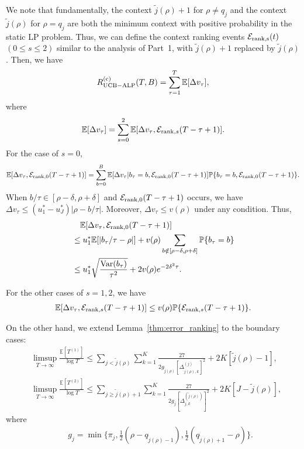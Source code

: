 We note that fundamentally, the context $\tilde{j}(\rho) + 1$ for $\rho \neq q_j$ and the context $\tilde{j}(\rho)$ for $\rho = q_j$ are both the minimum context with positive probability in the static LP problem.
Thus, we can define the  context ranking events $\mathcal{E}_{\rm rank,s}(t)$ $(0 \leq s\leq 2)$ similar to  the analysis of Part~1, with $\tilde{j}(\rho) + 1$ replaced by $\tilde{j}(\rho)$.
Then, we have
\begin{eqnarray}
R_{\rm {UCB-ALP}}^{({\rm c})}(T, B) = \sum_{\tau = 1}^T \mathbb{E}[\Delta {v}_{\tau}], \nonumber
\end{eqnarray}
where
\begin{eqnarray}
\mathbb{E}[\Delta v_\tau]  =  \sum_{s = 0}^2\mathbb{E}[\Delta {v}_{\tau},  \mathcal{E}_{{\rm rank}, s}(T - \tau + 1)]. \nonumber
\end{eqnarray}
For the case of $s = 0$,
\begin{align}
\mathbb{E}[\Delta {v}_{\tau},  \mathcal{E}_{{\rm rank}, 0}(T - \tau + 1)] = \sum_{b = 0}^B \mathbb{E}[\Delta {v}_{\tau}|b_{\tau} = b, \mathcal{E}_{{\rm rank}, 0}(T - \tau + 1)]\mathbb{P}\{b_\tau = b, \mathcal{E}_{{\rm rank}, 0}(T - \tau + 1)\}. \nonumber
\end{align}
When $b/\tau \in [\rho -\delta, \rho + \delta]$ and $\mathcal{E}_{{\rm rank}, 0}(T - \tau + 1)$ occurs, we have $\Delta {v}_{\tau} \leq (u_1^*-u_J^*) |\rho - b/\tau|$. Moreover, $\Delta {v}_{\tau} \leq v(\rho)$ under any condition. Thus,
\begin{align}
&\quad\mathbb{E}[\Delta {v}_{\tau},  \mathcal{E}_{{\rm rank}, 0}(T - \tau + 1)] \nonumber \\
&\leq u_1^* \mathbb{E}[|b_{\tau}/\tau - \rho|] + v(\rho) \sum_{b \notin [\rho -\delta, \rho + \delta]}\mathbb{P}\{b_\tau = b\}\nonumber \\
& \leq u_1^* \sqrt{\frac{{\rm Var}(b_{\tau})}{\tau^2}} + 2v(\rho)e^{-2\delta^2\tau}. \nonumber
\end{align}

For the other cases of $s = 1,2$, we have
\begin{eqnarray}
\mathbb{E}[\Delta {v}_{\tau},  \mathcal{E}_{{\rm rank}, s}(T - \tau + 1)] \leq v(\rho) \mathbb{P}\{\mathcal{E}_{{\rm rank}, s}(T - \tau + 1)\}. \nonumber
\end{eqnarray}

On the other hand, we extend Lemma~\ref{thm:error_ranking} to the boundary cases:
\begin{align}
&\limsup_{T\to \infty}\frac{\mathbb{E}[T^{(1)}]}{\log T} \leq \sum_{j < \tilde{j}(\rho)}\sum_{k=1}^K\frac{27}{2g_{\tilde{j}(\rho)} [\Delta^{(j)}_{\tilde{j}(\rho),k}]^2} + {2K[\tilde{j}(\rho)-1] },\nonumber\\
&\limsup_{T\to \infty}\frac{\mathbb{E}[T^{(2)}]}{\log T} \leq \sum_{j \geq \tilde{j}(\rho)+1}\sum_{k=1}^K\frac{27}{2g_j [\Delta^{(\tilde{j}(\rho))}_{j,k}]^2} + 2K[J - \tilde{j}(\rho)], \nonumber
\end{align}
where
\begin{align}
&\quad g_j  = \min\big\{\pi_j, \frac{1}{2}(\rho - q_{\tilde{j}(\rho)-1}), \frac{1}{2}(q_{\tilde{j}(\rho)+1} -\rho)\big\}.\nonumber
\end{align}

